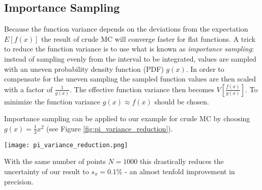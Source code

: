 \subsection{Importance Sampling}
Because the function variance depends on the deviations from the expectation $E[f(x)]$
the result of crude MC will converge faster for flat functions.
A trick to reduce the function variance is to use what is known as \textit{importance sampling}:
instead of sampling evenly from the interval to be integrated,
values are sampled with an uneven probability density function (PDF) $g(x)$.
In order to compensate for the uneven sampling the sampled function values are then scaled with a factor of $\frac{1}{g(x)}$.
The effective function variance then becomes $ V \left[ \frac{f(x)}{g(x)} \right] $.
To minimize the function variance $g(x) \approx f(x)$ should be chosen.

Importance sampling can be applied to our example for crude MC by choosing $g(x) = \frac{1}{3} x^2$
(see Figure \ref{fig:pi_variance_reduction}).
\begin{figure*}
	\centering
	\texttt{[image: pi\_variance\_reduction.png]}
	\caption{
		Visualization of crude MC with variance reduction.
		The ratio of $f(x)$ and $g(x)$ is much flatter than the individual functions.
		Samples concentrate towards high $x$ values where $g(x)$ is high.
	}
	\label{fig:pi_variance_reduction}
\end{figure*}
With the same number of points $N = 1000$ this drastically reduces the uncertainty of our result to $s_\pi = 0.1\%$
- an almost tenfold improvement in precision.
